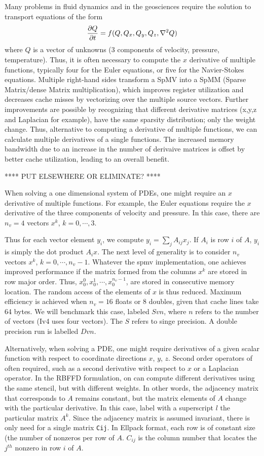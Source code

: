 \documentclass[10pt,conference,compsocconf]{IEEEtran}
\def\ttt#1{{\tt #1}}
\begin{document}
Many problems in fluid dynamics and in the geosciences require the solution to
transport equations of the form
$$
{\frac{\partial{Q}}{\partial{t}}} = f(Q,Q_x, Q_y, Q_z, \nabla^2 Q)
$$ 
where $Q$ is a vector of unknowns (3 components of velocity,
pressure, temperature). Thus, it is often necessary to compute the $x$
derivative of multiple functions, typically four for the Euler
equations, or five for the Navier-Stokes equations. Multiple
right-hand sides transform a SpMV into a SpMM (Sparse Matrix/dense
Matrix multiplication), which improves register utilization and
decreases cache misses by vectorizing over the multiple source
vectors. Further improvements are possible by recognizing that
different derivative matrices (x,y,z and Laplacian for example), have
the same sparsity distribution; only the weight change.  Thus,
alternative to computing a derivative of multiple functions, we can
calculate multiple derivatives of a single functions. The increased
memory bandwidth due to an increase in the number of derivaive
matrices is offset by better cache utilization, leading to an overall
benefit.


**** PUT ELSEWHERE OR ELIMINATE? ****

When solving a one dimensional system of PDEs, one might require an
$x$ derivative of multiple functions. For example, the Euler equations
require the $x$ derivative of the three components of velocity and
pressure. In this case, there are $n_v=4$ vectors $x^k$,
$k=0,\cdots,3$.

Thus for each vector element $y_i$, we compute $y_i = \sum_j A_{ij}
x_j$. If $A_i$ is row $i$ of $A$, $y_i$ is simply the dot product $A_i
x$. The next level of generality is to consider $n_v$ vectors $x^k$,
$k=0,\cdots,n_v-1$. Whatever the spmv implementation, one achieves
improved performance if the matrix formed from the columns $x^k$ are
stored in row major order. Thus, $x^0_0,x^1_0,\cdots,x^{n_v-1}_0$, are
stored in consecutive memory location. The random access of the
elements of $x$ is thus reduced. Maximum efficiency is achieved when
$n_v=16$ floats or $8$ doubles, given that cache lines take 64
bytes. We will benchmark this case, labeled $Svn$, where $n$ refers to
the number of vectors (Iv4 uses four vectors). The $S$ refers to singe
precision. A double precision run is labelled $Dvn$.

Alternatively, when solving a PDE, one might require derivatives of a
given scalar function with respect to coordinate directions $x$, $y$,
$z$. Second order operators of often required, such as a second
derivative with respect to $x$ or a Laplacian operator. In the RBFFD
formulation, on can compute different derivatives using the same
stencil, but with different weights. In other words, the adjacency
matrix that corresponds to $A$ remains constant, but the matrix
elements of $A$ change with the particular derivative.  In this case,
label with a superscript $l$ the particular matrix $A^k$. Since the
adjacency matrix is assumed invariant, there is only need for a single
matrix \ttt{C{ij}}. In Ellpack format, each row is of constant size
(the number of nonzeros per row of $A$. $C_{ij}$ is the column number
that locates the $j^{th}$ nonzero in row $i$ of $A$.
\end{document}
